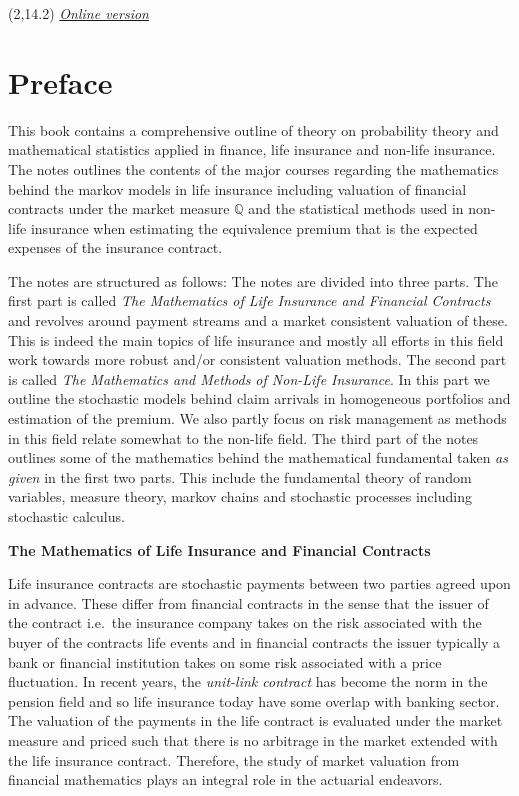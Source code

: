 \documentclass[a4paper,10pt,openany]{book}
\begin{document}
\begin{textblock}{12}(2,14.2)
\noindent\fontsize{16}{11}\selectfont \emph{\href{https://joakim-bilyk.github.io/books/theory}{Online version}}
\end{textblock}

\hspace{1pt}
\newpage

\chapter*{Preface}

This book contains a comprehensive outline of theory on probability theory and mathematical statistics applied in finance, life insurance and non-life insurance. The notes outlines the contents of the major courses regarding the mathematics behind the markov models in life insurance including valuation of financial contracts under the market measure \(\mathbb Q\) and the statistical methods used in non-life insurance when estimating the equivalence premium that is the expected expenses of the insurance contract.

The notes are structured as follows: The notes are divided into three parts. The first part is called \emph{The Mathematics of Life Insurance and Financial Contracts} and revolves around payment streams and a market consistent valuation of these. This is indeed the main topics of life insurance and mostly all efforts in this field work towards more robust and/or consistent valuation methods. The second part is called \emph{The Mathematics and Methods of Non-Life Insurance}. In this part we outline the stochastic models behind claim arrivals in homogeneous portfolios and estimation of the premium. We also partly focus on risk management as methods in this field relate somewhat to the non-life field. The third part of the notes outlines some of the mathematics behind the mathematical fundamental taken \emph{as given} in the first two parts. This include the fundamental theory of random variables, measure theory, markov chains and stochastic processes including stochastic calculus.

\textbf{The Mathematics of Life Insurance and Financial Contracts}

Life insurance contracts are stochastic payments between two parties agreed upon in advance. These differ from financial contracts in the sense that the issuer of the contract i.e.~the insurance company takes on the risk associated with the buyer of the contracts life events and in financial contracts the issuer typically a bank or financial institution takes on some risk associated with a price fluctuation. In recent years, the \emph{unit-link contract} has become the norm in the pension field and so life insurance today have some overlap with banking sector. The valuation of the payments in the life contract is evaluated under the market measure and priced such that there is no arbitrage in the market extended with the life insurance contract. Therefore, the study of market valuation from financial mathematics plays an integral role in the actuarial endeavors.
\end{document}
